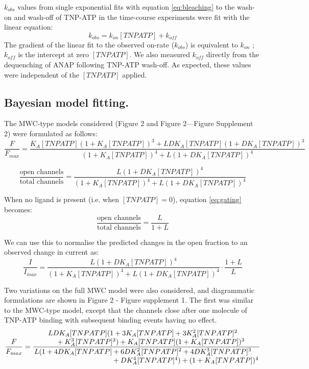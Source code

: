 \documentclass[10pt,lineno, doublespacing]{elife_modified}
\begin{document}
$k_{obs}$ values from single exponential fits with equation \ref{eq:bleaching} to the wash-on and wash-off of TNP-ATP in the time-course experiments were fit with the linear equation:
\begin{equation} \label{eq:kinetics}
    k_{obs} = k_{on}[TNPATP] + k_{off}
\end{equation}
The gradient of the linear fit to the observed on-rate ($k_{obs}$) is equivalent to $k_{on}$ ; $k_{off}$  is the intercept at zero $[TNPATP]$.
We also measured $k_{off}$  directly from the dequenching of ANAP following TNP-ATP wash-off.
As expected, these values were independent of the $[TNPATP]$ applied.

\subsection{Bayesian model fitting.}
The MWC-type models considered (Figure 2 and Figure 2—Figure Supplement 2) were formulated as follows:
\begin{equation} \label{eq:binding}
\frac{F}{F_{max}} = \frac
    {K_A[TNPATP](1+K_A[TNPATP])^3+LDK_A[TNPATP](1+DK_A[TNPATP])^3}
    {(1+K_A[TNPATP])^4+L(1+DK_A[TNPATP])^4}
\end{equation}

\begin{equation} \label{eq:gating}
\frac{\text{open channels}}{\text{total channels}} = \frac
    {L(1+DK_A[TNPATP])^4}
    {(1+K_A[TNPATP])^4+L(1+DK_A[TNPATP])^4}
\end{equation}

When no ligand is present (i.e. when $[TNPATP] = 0$), equation \ref{eq:gating} becomes:
\begin{equation} \label{eq:intrinsic_po}
\frac{\text{open channels}}{\text{total channels}} = \frac
    {L}
    {1+L}
\end{equation}

We can use this to normalise the predicted changes in the open fraction to an observed change in current as:
\begin{equation} \label{eq:normalised_po}
\frac{I}{I_{max}} = \frac
    {L(1+DK_A[TNPATP])^4}
    {(1+K_A[TNPATP])^4+L(1+DK_A[TNPATP])^4}\cdot
   \frac
    {1+L}
    {L}
\end{equation}

Two variations on the full MWC model were also considered, and diagrammatic formulations are shown in Figure 2 - Figure supplement 1.
The first was similar to the MWC-type model, except that the channels close after one molecule of TNP-ATP binding with subsequent binding events having no effect.
\begin{equation} \label{eq:binding_2}
\frac{F}{F_{max}} = \frac{\splitfrac
    {LDK_A[TNPATP](1+3K_A[TNPATP]+3K_A^2[TNPATP]^2}
    {+K_A^3[TNPATP]^3)+K_A[TNPATP](1+K_A[TNPATP])^3}}{\splitfrac
    {L(1+4DK_A[TNPATP]+6DK_A^2[TNPATP]^2+4DK_A^3[TNPATP]^3}
    {+DK_A^4[TNPATP]^4)+(1+K_A[TNPATP])^4}}
\end{equation}
\end{document}
